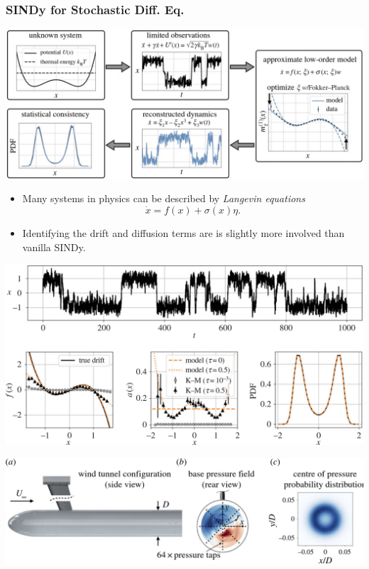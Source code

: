 \documentclass[aspectratio=169,compress,12pt,dvipsnames]{beamer}
\begin{document}
\begin{frame}
    \frametitle{SINDy for Stochastic Diff. Eq.}
    \vfill
    \begin{minipage}{.48\textwidth}
        \includegraphics[width=\textwidth]{imgs/langevin_regression_one.png}
    \end{minipage}%
    \hfill
    \begin{minipage}{.48\textwidth}
        \begin{itemize}
            \item Many systems in physics can be described by \emph{Langevin equations}
            \[
            \dot{x} = f(x) + \sigma(x) \eta.
            \]
            \item Identifying the drift and diffusion terms are is slightly more involved than vanilla SINDy.
        \end{itemize}
    \end{minipage}
    \vfill
\end{frame}

\begin{frame}
    \vfill
    \centering
    \includegraphics[width=\textwidth]{imgs/langevin_regression_three.png}
    \vfill
\end{frame}

\begin{frame}
    \vfill
    \centering
    \includegraphics[width=\textwidth]{imgs/langevin_regression_four.png}
    \vfill
\end{frame}
\end{document}
